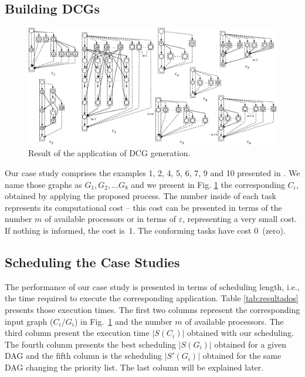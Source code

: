 \documentclass[twocolumn]{svjour3}
\begin{document}
\subsection{Building DCGs}

\begin{figure}[htb]
\begin{center}
\includegraphics[width=1.0\textwidth,angle=0]{figs/transformacoes.eps}
\caption{Result of the application of DCG generation.}
\label{fig:dgcdograham}
\end{center}
\end{figure}

Our case study {\color{blue}comprises the} examples 1, 2, 4, 5, 6, 7, 9 and 10 presented in \cite{Graham76}. We name those graphs as $G_1, G_2, \dots G_8$ and we present in Fig. \ref{fig:dgcdograham} the corresponding $C_i$, obtained by applying the proposed process. The number {\color{blue}inside of} each task represents its computational cost – this cost can be presented in terms of the number $m$ of available processors or in terms of $\varepsilon$, representing a very small cost. {\color{blue}If nothing is informed}, the cost is~1. The conforming tasks have cost 0~(zero).

\subsection{Scheduling the Case Studies}

The performance of our case study is presented in terms of scheduling length, i.e., the time required to execute the corresponding application. Table \ref{tab:resultados} presents those execution times. The first two columns represent the corresponding input graph ($C_i$/$G_i$) in Fig.~\ref{fig:dgcdograham} and the number $m$ of available processors. The third column present the execution time $|S(C_i)|$ obtained with our scheduling. The fourth colunm presents the best scheduling $|S(G_i)|$ obtained for a given DAG and the fifth column is the scheduling $|S'(G_i)|$ obtained for the same DAG changing the priority list. The last column will be explained later.
\end{document}
